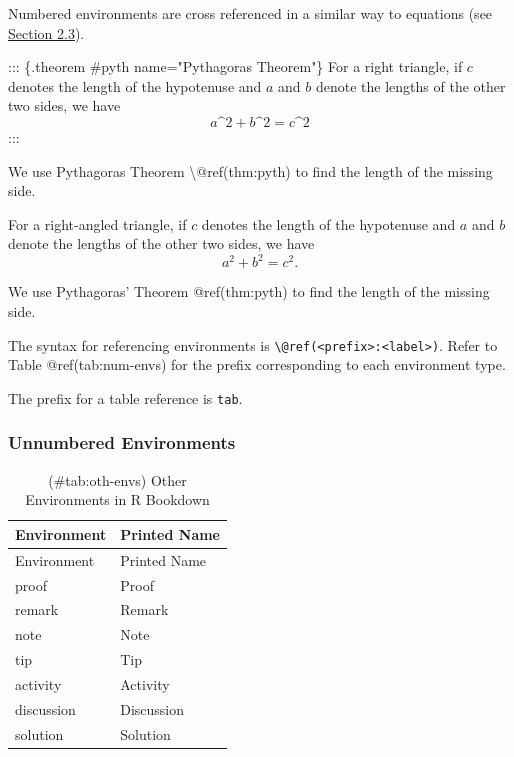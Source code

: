 \documentclass[
  letterpaper,
]{article}
\newenvironment{Shaded}{\begin{snugshade}}{\end{snugshade}}
\newcommand{\NormalTok}[1]{\textcolor[rgb]{0.00,0.23,0.31}{#1}}
\numberwithin{equation}{section}
\numberwithin{figure}{section}
\theoremstyle{break}
\begin{document}
Numbered environments are cross referenced in a similar way to equations
(see \hyperref[mathematics]{Section 2.3}).

\begin{Shaded}
\begin{Highlighting}[]
\NormalTok{::: \{.theorem \#pyth name="Pythagoras\textquotesingle{} Theorem"\}}
\NormalTok{For a right triangle, if $c$ denotes the length of the hypotenuse}
\NormalTok{and $a$ and $b$ denote the lengths of the other two sides, we have}
\NormalTok{$$a\^{}2 + b\^{}2 = c\^{}2$$}
\NormalTok{:::}
  
\NormalTok{We use Pythagoras\textquotesingle{} Theorem \textbackslash{}@ref(thm:pyth) to find the length of the missing side.}
\end{Highlighting}
\end{Shaded}

\label{pyth}
For a right-angled triangle, if \(c\) denotes the length of the
hypotenuse and \(a\) and \(b\) denote the lengths of the other two
sides, we have \[a^2 + b^2 = c^2.\]

We use Pythagoras' Theorem @ref(thm:pyth) to find the length of the
missing side.

The syntax for referencing environments is
\texttt{\textbackslash{}@ref(\textless{}prefix\textgreater{}:\textless{}label\textgreater{})}.
Refer to Table @ref(tab:num-envs) for the prefix corresponding to each
environment type.

The prefix for a table reference is \texttt{tab}.

\subsubsection{Unnumbered Environments}\label{unnumbered-environments}

\begin{longtable}[]{@{}ll@{}}
\caption{(\#tab:oth-envs) Other Environments in R
Bookdown}\tabularnewline
\toprule\noalign{}
Environment & Printed Name \\
\midrule\noalign{}
\endfirsthead
\toprule\noalign{}
Environment & Printed Name \\
\midrule\noalign{}
\endhead
\bottomrule\noalign{}
\endlastfoot
proof & Proof \\
remark & Remark \\
note & Note \\
tip & Tip \\
activity & Activity \\
discussion & Discussion \\
solution & Solution \\
\end{longtable}
\end{document}
